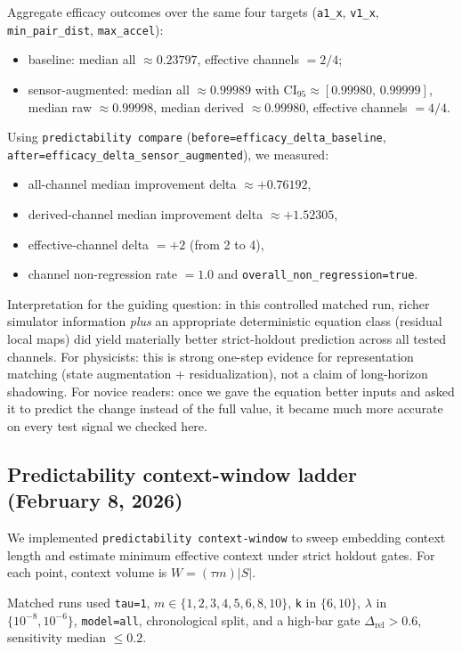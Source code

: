 \documentclass[11pt]{article}
\begin{document}
Aggregate efficacy outcomes over the same four targets (\texttt{a1\_x}, \texttt{v1\_x}, \texttt{min\_pair\_dist}, \texttt{max\_accel}):
\begin{itemize}
\item baseline: median all $\approx 0.23797$, effective channels $=2/4$;
\item sensor-augmented: median all $\approx 0.99989$ with CI$_{95}\approx[0.99980,\,0.99999]$, median raw $\approx 0.99998$, median derived $\approx 0.99980$, effective channels $=4/4$.
\end{itemize}

Using \texttt{predictability compare} (\texttt{before=efficacy\_delta\_baseline}, \texttt{after=efficacy\_delta\_sensor\_augmented}), we measured:
\begin{itemize}
\item all-channel median improvement delta $\approx +0.76192$,
\item derived-channel median improvement delta $\approx +1.52305$,
\item effective-channel delta $=+2$ (from 2 to 4),
\item channel non-regression rate $=1.0$ and \texttt{overall\_non\_regression=true}.
\end{itemize}

Interpretation for the guiding question: in this controlled matched run, richer simulator information \emph{plus} an appropriate deterministic equation class (residual local maps) did yield materially better strict-holdout prediction across all tested channels.
For physicists: this is strong one-step evidence for representation matching (state augmentation + residualization), not a claim of long-horizon shadowing.
For novice readers: once we gave the equation better inputs and asked it to predict the change instead of the full value, it became much more accurate on every test signal we checked here.

\subsection{Predictability context-window ladder (February 8, 2026)}
We implemented \texttt{predictability context-window} to sweep embedding context length and estimate minimum effective context under strict holdout gates. For each point, context volume is $W=(\tau m)|S|$.

Matched runs used \texttt{tau=1}, $m\in\{1,2,3,4,5,6,8,10\}$, \texttt{k} in $\{6,10\}$, $\lambda$ in $\{10^{-8},10^{-6}\}$, \texttt{model=all}, chronological split, and a high-bar gate $\Delta_{\mathrm{rel}}>0.6$, sensitivity median $\le 0.2$.
\end{document}
